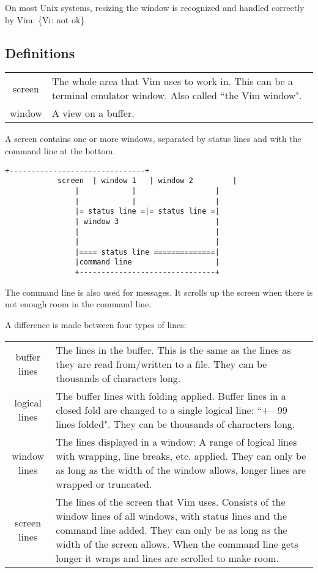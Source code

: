 On most Unix systems, resizing the window is recognized and handled correctly by Vim.
\{Vi: not ok\}

\subsection{Definitions}
\label{definitions}
\begin{tabularx}{\textwidth}{c X}
				screen & The whole area that Vim uses to work in.
				This can be a terminal emulator window.
				Also called ``the Vim window". \\
				window & A view on a buffer.
\end{tabularx}

A screen contains one or more windows, separated by status lines and with the command line at the bottom.

\begin{Verbatim}[samepage=true]
				+-------------------------------+
			screen  | window 1   | window 2         |
				|            |                  |
				|            |                  |
				|= status line =|= status line =|
				| window 3                      |
				|                               |
				|                               |
				|==== status line ==============|
				|command line                   |
				+-------------------------------+
\end{Verbatim}

The command line is also used for messages.
It scrolls up the screen when there is not enough room in the command line.

A difference is made between four types of lines:

\begin{center}
				\begin{tabularx}{\textwidth}{c X}
								buffer lines &
								The lines in the buffer.
								This is the same as the lines as they are read from/written to a file.
								They can be thousands of characters long. \\

								logical lines &
								The buffer lines with folding applied.
								Buffer lines in a closed fold are changed to a single logical line: ``+-- 99 lines folded".
								They can be thousands of characters long.\\

								window lines &
								The lines displayed in a window: A range of logical lines with wrapping, line breaks, etc.  applied.
								They can only be as long as the width of the window allows, longer lines are wrapped or truncated.\\

								screen lines &
								The lines of the screen that Vim uses.
								Consists of the window lines of all windows, with status lines and the command line added.
								They can only be as long as the width of the screen allows.
								When the command line gets longer it wraps and lines are scrolled to make room.
				\end{tabularx}
\end{center}

